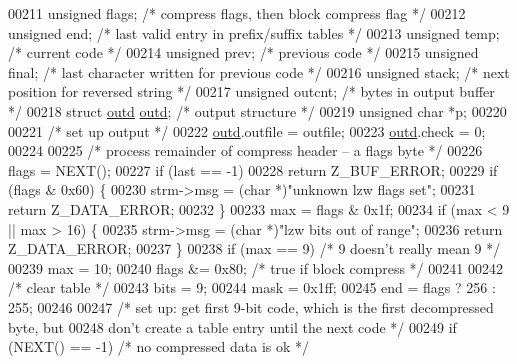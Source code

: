 \begin{DoxyCode}
00211     \textcolor{keywordtype}{unsigned} flags;             \textcolor{comment}{/* compress flags, then block compress flag */}
00212     \textcolor{keywordtype}{unsigned} end;               \textcolor{comment}{/* last valid entry in prefix/suffix tables */}
00213     \textcolor{keywordtype}{unsigned} temp;              \textcolor{comment}{/* current code */}
00214     \textcolor{keywordtype}{unsigned} prev;              \textcolor{comment}{/* previous code */}
00215     \textcolor{keywordtype}{unsigned} \textcolor{keyword}{final};             \textcolor{comment}{/* last character written for previous code */}
00216     \textcolor{keywordtype}{unsigned} stack;             \textcolor{comment}{/* next position for reversed string */}
00217     \textcolor{keywordtype}{unsigned} outcnt;            \textcolor{comment}{/* bytes in output buffer */}
00218     \textcolor{keyword}{struct }\hyperlink{structoutd}{outd} \hyperlink{structoutd}{outd};           \textcolor{comment}{/* output structure */}
00219     \textcolor{keywordtype}{unsigned} \textcolor{keywordtype}{char} *p;
00220 
00221     \textcolor{comment}{/* set up output */}
00222     \hyperlink{structoutd}{outd}.outfile = outfile;
00223     \hyperlink{structoutd}{outd}.check = 0;
00224 
00225     \textcolor{comment}{/* process remainder of compress header -- a flags byte */}
00226     flags = NEXT();
00227     \textcolor{keywordflow}{if} (last == -1)
00228         \textcolor{keywordflow}{return} Z\_BUF\_ERROR;
00229     \textcolor{keywordflow}{if} (flags & 0x60) \{
00230         strm->msg = (\textcolor{keywordtype}{char} *)\textcolor{stringliteral}{"unknown lzw flags set"};
00231         \textcolor{keywordflow}{return} Z\_DATA\_ERROR;
00232     \}
00233     max = flags & 0x1f;
00234     \textcolor{keywordflow}{if} (max < 9 || max > 16) \{
00235         strm->msg = (\textcolor{keywordtype}{char} *)\textcolor{stringliteral}{"lzw bits out of range"};
00236         \textcolor{keywordflow}{return} Z\_DATA\_ERROR;
00237     \}
00238     \textcolor{keywordflow}{if} (max == 9)                           \textcolor{comment}{/* 9 doesn't really mean 9 */}
00239         max = 10;
00240     flags &= 0x80;                          \textcolor{comment}{/* true if block compress */}
00241 
00242     \textcolor{comment}{/* clear table */}
00243     bits = 9;
00244     mask = 0x1ff;
00245     end = flags ? 256 : 255;
00246 
00247     \textcolor{comment}{/* set up: get first 9-bit code, which is the first decompressed byte, but}
00248 \textcolor{comment}{       don't create a table entry until the next code */}
00249     \textcolor{keywordflow}{if} (NEXT() == -1)                       \textcolor{comment}{/* no compressed data is ok */}

\end{DoxyCode}
